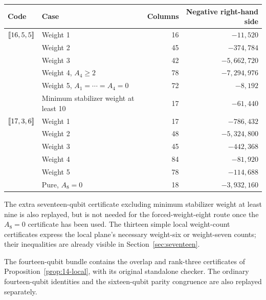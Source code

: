 \begin{center}\small
\begin{tabular}{@{}llrr@{}}\toprule
Code&Case&Columns&Negative right-hand side\\\midrule
\([\![16,5,5]\!]\)&Weight 1&16&\(-11,520\)\\
&Weight 2&45&\(-374,784\)\\
&Weight 3&42&\(-5,662,720\)\\
&Weight 4, \(A_4\geq2\)&78&\(-7,294,976\)\\
&Weight 5, \(A_1=\cdots=A_4=0\)&72&\(-8,192\)\\
&Minimum stabilizer weight at least 10&17&\(-61,440\)\\\midrule
\([\![17,3,6]\!]\)&Weight 1&17&\(-786,432\)\\
&Weight 2&48&\(-5,324,800\)\\
&Weight 3&45&\(-442,368\)\\
&Weight 4&84&\(-81,920\)\\
&Weight 5&78&\(-114,688\)\\
&Pure, \(A_8=0\)&18&\(-3,932,160\)\\\bottomrule
\end{tabular}
\end{center}

The extra seventeen-qubit certificate excluding minimum stabilizer weight
at least nine is also replayed, but is not needed for the forced-weight-eight
route once the \(A_8=0\) certificate has been used. The thirteen simple
local weight-count certificates express the local plane's necessary
weight-six or weight-seven counts; their inequalities are already visible
in Section~\ref{sec:seventeen}.

The fourteen-qubit bundle contains the overlap and rank-three certificates
of Proposition~\ref{prop:14-local}, with its original standalone checker.
The ordinary fourteen-qubit identities and the sixteen-qubit parity
congruence are also replayed separately.
